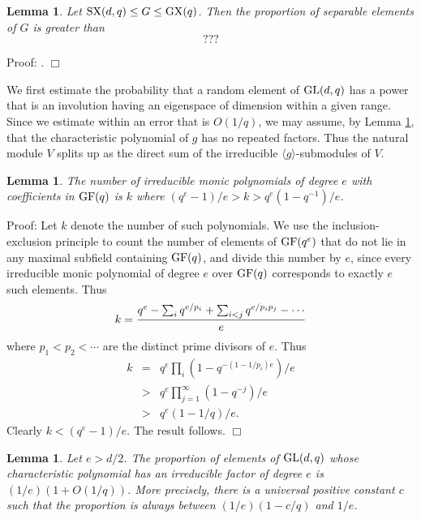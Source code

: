 \documentclass[12pt]{article}
\newtheorem{lemma}[definition]{Lemma}
\newenvironment{proof}{\normalsize {\sc Proof}:}{{\hfill $\Box$ \\}}
\def\GL{{\rm GL}}
\def\GF{{\rm GF}}
\def\SX{{\rm SX}}
\def\GX{{\rm GX}}
\begin{document}
\begin{lemma}\label{Lemma5.1}
Let $\SX(d,q)\le G\le\GX(q)$. Then
the proportion of separable elements of $G$  is greater than 
$$ ???$$
\end{lemma}
\begin{proof} 
\cite{GuralnickLubeck01}.
\end{proof}

We first estimate the probability that a random element of
$\GL(d,q)$ has a power that is an involution having an eigenspace
of dimension within a given range. 
Since we estimate within an error that is
$O(1/q)$, we may assume, by Lemma \ref{Lemma5.1}, that the characteristic 
polynomial of $g$ has no repeated factors. Thus the natural module 
$V$ splits up as the direct sum of the 
irreducible $\langle g\rangle$-submodules of $V$.

\begin{lemma}\label{monic} 
The number of irreducible monic polynomials of degree
$e$ with coefficients in $\GF(q)$ is $k$ where
$(q^e-1)/e>k>q^e(1-q^{-1})/e$.
\end{lemma}
\begin{proof}
Let $k$ denote the number of such polynomials.
We use the inclusion-exclusion principle to count the
number of elements of $\GF(q^e)$ that do not lie in any  maximal
subfield containing $\GF(q)$, and divide this number by $e$, since
every irreducible monic polynomial of degree $e$ over $\GF(q)$ corresponds
to exactly $e$ such elements.  Thus 
$$k = {q^e-\sum_iq^{e/p_i}+\sum_{i<j}q^{e/p_ip_j}-\cdots\over e}$$ 
where $p_1<p_2<\cdots$ are the distinct prime divisors of $e$. 
Thus 
\begin{eqnarray*}
k & = & q^e\prod_i(1-q^{-(1-1/p_i)e})/e \\
    & > & q^e\prod_{j=1}^\infty(1-q^{-j})/e \\
    & > & q^e (1 - 1/q ) / e. 
\end{eqnarray*}  
Clearly $k<(q^e-1)/e$. The result follows.
\end{proof}

\begin{lemma}\label{Lemma5.3} Let $e>d/2$. The proportion of elements of
$\GL(d,q)$ whose characteristic polynomial has an irreducible factor
of degree $e$ is $(1/e)(1+O(1/q))$. More precisely, there is a
universal positive constant $c$  such that the proportion is always
between $(1/e)(1-c/q)$ and $1/e$.
\end{lemma}
\end{document}
